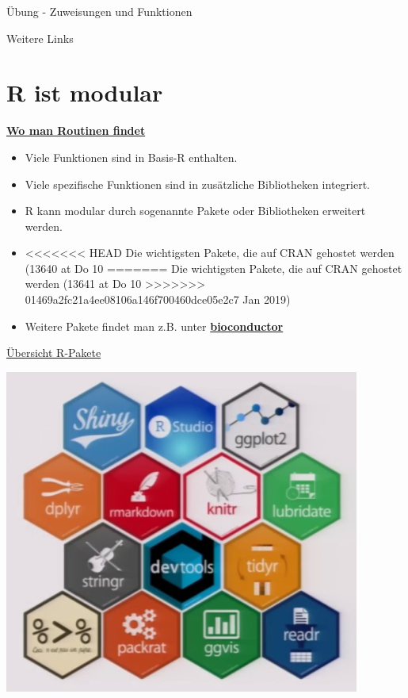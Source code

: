 \documentclass[ignorenonframetext,]{beamer}
\providecommand{\tightlist}{%
  \setlength{\itemsep}{0pt}\setlength{\parskip}{0pt}}
\begin{document}
\begin{frame}[fragile]{Übung - Zuweisungen und Funktionen}
\begin{frame}{Weitere Links}
\end{frame}

\hypertarget{r-ist-modular}{%
\section{R ist modular}\label{r-ist-modular}}

\begin{frame}{\href{https://stats.idre.ucla.edu/r/seminars/intro/}{\textbf{Wo
man Routinen findet}}}
\protect\hypertarget{wo-man-routinen-findet}{}

\begin{itemize}
\tightlist
\item
  Viele Funktionen sind in Basis-R enthalten.
\item
  Viele spezifische Funktionen sind in zusätzliche Bibliotheken
  integriert.
\item
  R kann modular durch sogenannte Pakete oder Bibliotheken erweitert
  werden.
\item
<<<<<<< HEAD
  Die wichtigsten Pakete, die auf CRAN gehostet werden (13640 at Do 10
=======
  Die wichtigsten Pakete, die auf CRAN gehostet werden (13641 at Do 10
>>>>>>> 01469a2fc21a4ee08106a146f700460dce05e2c7
  Jan 2019)
\item
  Weitere Pakete findet man z.B. unter
  \href{www.bioconductor.org}{\textbf{bioconductor}}
\end{itemize}

\end{frame}

\begin{frame}{\href{https://www.youtube.com/watch?v=kKI9--Opmso}{Übersicht
R-Pakete}}
\protect\hypertarget{ubersicht-r-pakete}{}

\includegraphics{figure/packages_overview.PNG}


\end{frame}
\end{frame}
\end{document}
